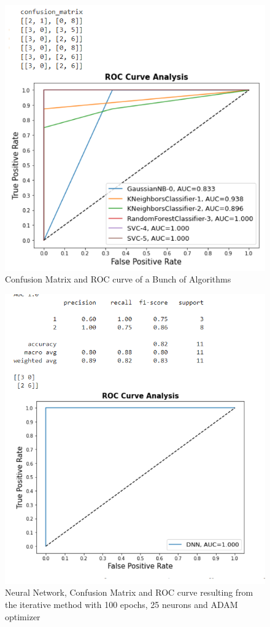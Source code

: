 \espaco
\begin{figure}[ht] \centering \includegraphics[scale=0.5]{figures/Results.png} 
\caption{Confusion Matrix and ROC curve of a Bunch of Algorithms} \label{fig:results}
 \end{figure}
 

\begin{figure}[ht] \centering \includegraphics[scale=0.5]{figures/ResultsNN.png} 
\caption{Neural Network, Confusion Matrix and ROC curve resulting from the iterative method with 100 epochs, 25 neurons and ADAM optimizer} \label{fig:resultsNN}
 \end{figure}
 

